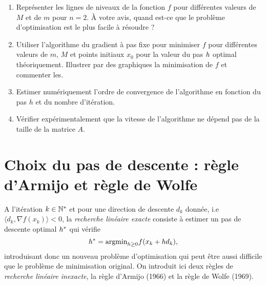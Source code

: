 \documentclass[a4paper,french,12pt]{article}
\begin{document}
        

\begin{enumerate}
\item Représenter les lignes de niveaux de la fonction $f$ pour différentes valeurs de $M$ et de $m$ pour $n=2$. À votre avis, quand est-ce que le problème d'optimisation est le plus facile à résoudre ?
\item Utiliser l'algorithme du gradient à pas fixe pour minimiser $f$
  pour différentes valeurs de $m$, $M$ et points initiaux $x_0$ pour
  la valeur du pas $h$ optimal théoriquement. Illustrer par des
  graphiques la minimisation de $f$ et commenter les.
\item Estimer numériquement l'ordre de convergence de l'algorithme en fonction du pas $h$ et du nombre d'itération. 
\item Vérifier expérimentalement que la vitesse de l'algorithme ne dépend pas de la taille de la matrice $A$.
\end{enumerate}

%
\section{Choix du pas de descente : règle d'Armijo et règle de Wolfe}
%
A l'itération $k \in \mathbb{N}^*$ et pour une direction de descente $d_{k}$ donnée, i.e $\langle d_{k},\nabla f(x_{k})\rangle<0$, la \textit{recherche linéaire exacte}
consiste à estimer un pas de descente optimal $h^*$ qui vérifie
\[
h^* = \text{argmin}_{h\geq 0} f(x_{k} + h d_{k}),
\]
introduisant donc un nouveau problème d'optimisation qui peut être aussi difficile que le problème de minimisation original. On introduit ici deux règles de \textit{recherche linéaire inexacte}, la règle d'Armijo (1966) et la règle de Wolfe (1969).
\end{document}
